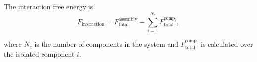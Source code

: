 \noindent The interaction free energy is
%
\begin{equation} \label{eq:interaction_energy}
F_{\text{interaction}} = F_{\text{total}}^{\text{assembly}} - \sum_{i=1}^{N_c} F_{\text{total}}^{\text{comp}_i},
\end{equation}

\noindent where $N_c$ is the number of components in the system and $F_{\text{total}}^{\text{comp}_i}$ is calculated over the isolated component $i$.